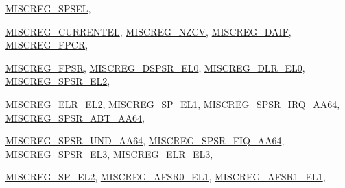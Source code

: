 \begin{DoxyCompactItemize}
\hyperlink{namespaceArmISA_a1e522017e015d4c7efd6b2360143aa67a52805ddefdc03625ac966afd0dacd15b}{MISCREG\_\-SPSEL}, 
\par
\hyperlink{namespaceArmISA_a1e522017e015d4c7efd6b2360143aa67af99c21a6070a1efc224cd1a963dc0185}{MISCREG\_\-CURRENTEL}, 
\hyperlink{namespaceArmISA_a1e522017e015d4c7efd6b2360143aa67a67cdfd960c24b2f9b2b2179ff36d992f}{MISCREG\_\-NZCV}, 
\hyperlink{namespaceArmISA_a1e522017e015d4c7efd6b2360143aa67aa9715d20c8e978c2131a450c13f258a0}{MISCREG\_\-DAIF}, 
\hyperlink{namespaceArmISA_a1e522017e015d4c7efd6b2360143aa67a015a601dd43bbdcfc4010fd4b4ab8489}{MISCREG\_\-FPCR}, 
\par
\hyperlink{namespaceArmISA_a1e522017e015d4c7efd6b2360143aa67a40ecd2acf8d57238e294ef96009523ca}{MISCREG\_\-FPSR}, 
\hyperlink{namespaceArmISA_a1e522017e015d4c7efd6b2360143aa67a6daf6d0c61873574672c56bbdf460d18}{MISCREG\_\-DSPSR\_\-EL0}, 
\hyperlink{namespaceArmISA_a1e522017e015d4c7efd6b2360143aa67a2c86565e4ca380b6a881c6a3c0777adc}{MISCREG\_\-DLR\_\-EL0}, 
\hyperlink{namespaceArmISA_a1e522017e015d4c7efd6b2360143aa67a64a340b58bc8c5360f002a03eabe69bf}{MISCREG\_\-SPSR\_\-EL2}, 
\par
\hyperlink{namespaceArmISA_a1e522017e015d4c7efd6b2360143aa67a86f93b4c427c39b2cf6206b8ea6478b7}{MISCREG\_\-ELR\_\-EL2}, 
\hyperlink{namespaceArmISA_a1e522017e015d4c7efd6b2360143aa67aeccc11e91d29ceb8bba37814e94c40de}{MISCREG\_\-SP\_\-EL1}, 
\hyperlink{namespaceArmISA_a1e522017e015d4c7efd6b2360143aa67a27b0f6a5e8735b8f6e3fe89ea7a77ed3}{MISCREG\_\-SPSR\_\-IRQ\_\-AA64}, 
\hyperlink{namespaceArmISA_a1e522017e015d4c7efd6b2360143aa67a934f26d3424d44a2b38b2580b62fa92e}{MISCREG\_\-SPSR\_\-ABT\_\-AA64}, 
\par
\hyperlink{namespaceArmISA_a1e522017e015d4c7efd6b2360143aa67a6eaed8fc36ef37cddd720f1ec6ce79c4}{MISCREG\_\-SPSR\_\-UND\_\-AA64}, 
\hyperlink{namespaceArmISA_a1e522017e015d4c7efd6b2360143aa67a0bf5f3d46d0092fc524936c43c41db18}{MISCREG\_\-SPSR\_\-FIQ\_\-AA64}, 
\hyperlink{namespaceArmISA_a1e522017e015d4c7efd6b2360143aa67a0da4d390555ba2579052e6727918aadb}{MISCREG\_\-SPSR\_\-EL3}, 
\hyperlink{namespaceArmISA_a1e522017e015d4c7efd6b2360143aa67ada55d314a49021457ff1c83a8c420249}{MISCREG\_\-ELR\_\-EL3}, 
\par
\hyperlink{namespaceArmISA_a1e522017e015d4c7efd6b2360143aa67af15b886da0e9215ed3c13ab6b3617433}{MISCREG\_\-SP\_\-EL2}, 
\hyperlink{namespaceArmISA_a1e522017e015d4c7efd6b2360143aa67a250fd6183af9c480706a30e1eb54fba5}{MISCREG\_\-AFSR0\_\-EL1}, 
\hyperlink{namespaceArmISA_a1e522017e015d4c7efd6b2360143aa67ac6198c93f02f79c9ddefcd482cbb9dfe}{MISCREG\_\-AFSR1\_\-EL1}, 

\end{DoxyCompactItemize}
